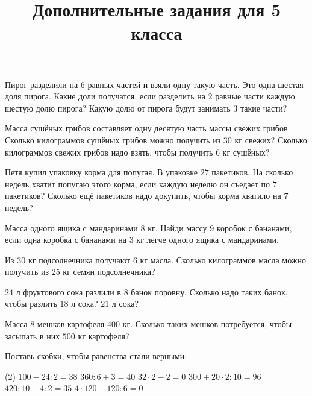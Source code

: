 \begin{class}[number=2]
	\begin{listofex}
		\item Пирог разделили на \( 6 \) равных частей и взяли одну такую часть. Это одна шестая доля пирога. Какие доли получатся, если разделить на \( 2 \) равные части каждую шестую долю пирога? Какую долю от пирога будут занимать \( 3 \) такие части?
		\item Масса сушёных грибов составляет одну десятую часть массы свежих грибов. Сколько килограммов сушёных грибов можно получить из \( 30 \) кг свежих? Сколько килограммов свежих грибов надо взять, чтобы получить \( 6 \) кг сушёных?
		\item Петя купил упаковку корма для попугая. В упаковке \( 27 \) пакетиков. На сколько недель хватит попугаю этого корма, если каждую неделю он съедает по \( 7 \) пакетиков? Сколько ещё пакетиков надо докупить, чтобы корма хватило на \( 7 \) недель?
		\item Масса одного ящика с мандаринами \( 8 \) кг. Найди массу \( 9 \) коробок с бананами, если одна коробка с бананами на \( 3 \) кг легче одного ящика с мандаринами.
		\item Из \( 30 \) кг подсолнечника получают \( 6 \) кг масла. Сколько килограммов масла можно получить из \( 25 \) кг семян подсолнечника?
		\item \( 24 \) л фруктового сока разлили в \( 8 \) банок поровну. Сколько надо таких банок, чтобы разлить \( 18 \) л сока? \( 21 \) л сока?
		\item Масса \( 8 \) мешков картофеля \( 400 \) кг. Сколько таких мешков потребуется, чтобы засыпать в них \( 500 \) кг картофеля?
		\item Поставь скобки, чтобы равенства стали верными:
		\begin{tasks}(2)
			\task \( 100-24:2=38 \)
			\task \( 360:6+3=40 \)
			\task \( 32\cdot2-2=0 \)
			\task \( 300+20\cdot2:10=96 \)
			\task \( 420:10-4:2=35 \)
			\task \( 4\cdot120-120:6=0 \)
		\end{tasks}
	\end{listofex}
		\title{Дополнительные задания для 5 класса}
		\begin{listofex}

\end{listofex}
\end{class}

